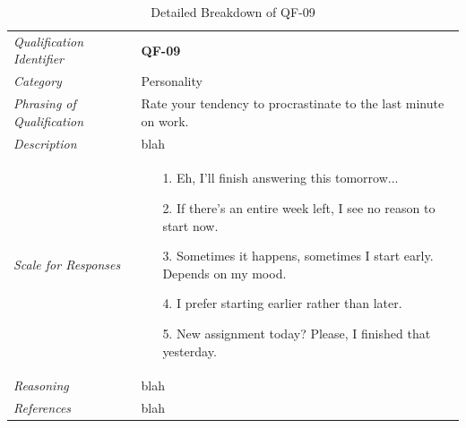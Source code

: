 \documentclass[12pt,letterpaper]{article}
\begin{document}
\begin{table}[H]
	\caption{Detailed Breakdown of QF-09}
	\begin{tabu} to 
		\toprule
		Qualification Identifier & {\bf QF-09}\\
		Category & Personality \\
		Phrasing of Qualification & Rate your tendency to procrastinate to the last minute on work. \\
		Description & blah\\
		Scale for Responses &
		\begin{minipage}[t]{\linewidth}
			\begin{enumerate}
				\item[1.] Eh, I'll finish answering this tomorrow...
				\item[2.] If there's an entire week left, I see no reason to start now.
				\item[3.] Sometimes it happens, sometimes I start early. Depends on my mood.
				\item[4.] I prefer starting earlier rather than later.
				\item[5.] New assignment today? Please, I finished that yesterday.
			\end{enumerate}
		\end{minipage}\\
		Reasoning & blah\\
		References & blah\\
		\toprule
	\end{tabu}
\end{table}
\end{document}
